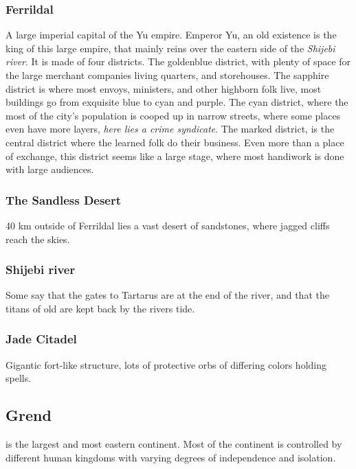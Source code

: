 \documentclass[a4paper]{article}
\begin{document}
\subsubsection{Ferrildal}
A large imperial capital of the Yu empire. Emperor Yu, an old existence is the king of this large empire, that mainly reins over the eastern side of the \textit{Shijebi river}. It is made of four districts. The goldenblue district, with plenty of space for the large merchant companies living quarters, and storehouses. The sapphire district is where most envoys, ministers, and other highborn folk live, most buildings go from exquisite blue to cyan and purple. The cyan district, where the most of the city's population is cooped up in narrow streets, where some places even have more layers, \textit{here lies a crime syndicate}. The marked district, is the central district where the learned folk do their business. Even more than a place of exchange, this district seems like a large stage, where most handiwork is done with large audiences.

\subsubsection{The Sandless Desert}
40 km outside of Ferrildal lies a vast desert of sandstones, where jagged cliffs reach the skies.


\subsubsection{Shijebi river}
Some say that the gates to Tartarus are at the end of the river, and that the titans of old are kept back by the rivers tide.

\subsubsection{Jade Citadel}
Gigantic fort-like structure, lots of protective orbs of differing colors holding spells.

\subsection{Grend}
is the largest and most eastern continent. Most of the continent is controlled by different human kingdoms with varying degrees of independence and isolation.
\end{document}
